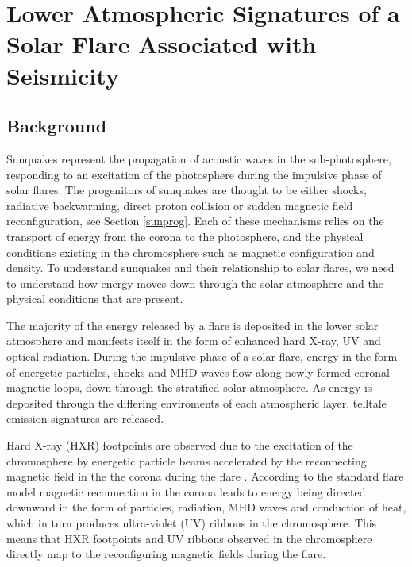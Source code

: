 \section{Lower Atmospheric Signatures of a Solar Flare Associated with Seismicity}




\subsection{Background} 
Sunquakes represent the propagation of acoustic waves in the sub-photosphere, responding to an excitation of the photosphere during the impulsive phase of solar flares. The progenitors of sunquakes are thought to be either shocks, radiative backwarming, direct proton collision or sudden magnetic field reconfiguration, see Section \ref{sunprog}. Each of these mechanisms relies on the transport of energy from the corona to the photosphere, and the physical conditions existing in the chromosphere such as magnetic configuration and density. To understand sunquakes and their relationship to solar flares, we need to understand how energy moves down through the solar atmosphere and the physical conditions that are present. 

The majority of the energy released by a flare is deposited in the lower solar atmosphere and manifests itself in the form of enhanced hard X-ray, UV and optical radiation. During the impulsive phase of a solar flare, energy in the form of energetic particles, shocks and MHD waves flow along newly formed coronal magnetic loops, down through the stratified solar atmosphere. As energy is deposited through the differing enviroments of each atmospheric layer, telltale emission signatures are released. 

Hard X-ray (HXR) footpoints are observed due to the excitation of the chromosphere by energetic particle beams accelerated by the reconnecting magnetic field in the the corona during the flare \citep{1995ApJ...455..347A}. According to the standard flare model \citep{1964NASSP..50..451C, 1966Natur.211..695S, 1974SoPh...34..323H, 1976SoPh...50...85K} magnetic reconnection in the corona leads to energy being directed downward in the form of particles, radiation, MHD waves and conduction of heat, which in turn produces ultra-violet (UV) ribbons in the chromosphere. This means that HXR footpoints and UV ribbons observed in the chromosphere directly map to the reconfiguring magnetic fields during the flare. 

